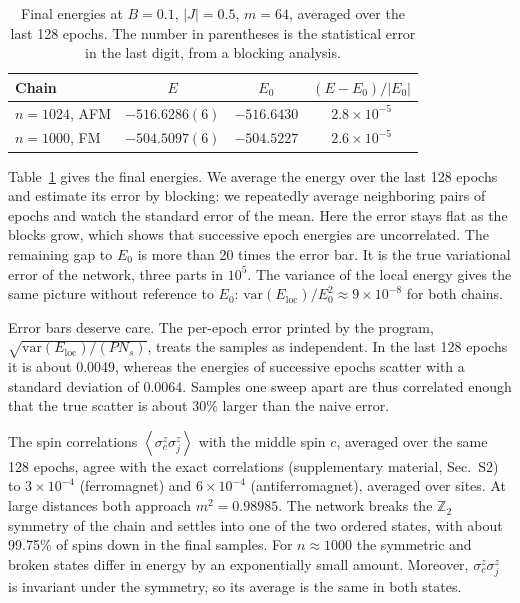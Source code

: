 \documentclass[aps,prb,preprint,amsmath,amssymb,nofootinbib,longbibliography]{revtex4-2}
\newcommand{\ev}[1]{\left\langle #1 \right\rangle}
\newcommand{\Eloc}{E_{\mathrm{loc}}}
\begin{document}
\begin{table}[b]
\caption{Final energies at $B = 0.1$, $|J| = 0.5$, $m = 64$, averaged over the last 128 epochs. The number in
parentheses is the statistical error in the last digit, from a blocking analysis.}
\label{tab:long}
\begin{ruledtabular}
\begin{tabular}{lccc}
Chain & $E$ & $E_0$ & $(E - E_0)/|E_0|$ \\
\hline
$n = 1024$, AFM & $-516.6286(6)$ & $-516.6430$ & $2.8\times 10^{-5}$ \\
$n = 1000$, FM & $-504.5097(6)$ & $-504.5227$ & $2.6\times 10^{-5}$ \\
\end{tabular}
\end{ruledtabular}
\end{table}

Table~\ref{tab:long} gives the final energies. We average the energy over the last 128 epochs and estimate its error
by blocking:\cite{flyvbjerg1989} we repeatedly average neighboring pairs of epochs and watch the standard error of
the mean. Here the error stays flat as the blocks grow, which shows that successive epoch energies are uncorrelated.
The remaining gap to $E_0$ is more than 20 times the error bar. It is the true variational error of the network, three
parts in $10^5$. The variance of the local energy gives the same picture without reference to $E_0$:
$\mathrm{var}(\Eloc)/E_0^2 \approx 9\times10^{-8}$ for both chains.

Error bars deserve care. The per-epoch error printed by the program, $\sqrt{\mathrm{var}(\Eloc)/(PN_s)}$, treats the
samples as independent. In the last 128 epochs it is about 0.0049, whereas the energies of successive epochs scatter
with a standard deviation of 0.0064. Samples one sweep apart are thus correlated enough that the true scatter is
about 30\% larger than the naive error.

The spin correlations $\ev{\sigma^z_c\sigma^z_j}$ with the middle spin $c$, averaged over the same 128 epochs, agree
with the exact correlations (supplementary material, Sec.~S2) to $3\times10^{-4}$ (ferromagnet) and $6\times10^{-4}$
(antiferromagnet), averaged over sites. At large distances both approach $m^2 = 0.98985$. The network breaks the
$\mathbb{Z}_2$ symmetry of the chain and settles into one of the two ordered states, with about 99.75\% of spins down
in the final samples. For $n \approx 1000$ the symmetric and broken states differ in energy by an exponentially small
amount. Moreover, $\sigma^z_c\sigma^z_j$ is invariant under the symmetry, so its average is the same in both states.
\end{document}
